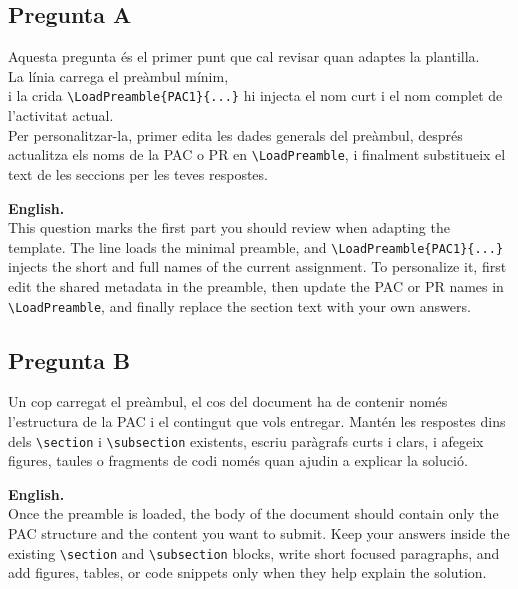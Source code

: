 		\subsection{Pregunta A}
			Aquesta pregunta és el primer punt que cal revisar quan adaptes la plantilla.\\
			La línia \verb|| carrega el preàmbul mínim,\\
			i la crida \verb|\LoadPreamble{PAC1}{...}| hi injecta el nom curt i el nom complet de l'activitat actual.
			\\
			Per personalitzar-la, primer edita les dades generals del preàmbul, després actualitza els noms de la PAC o PR en \verb|\LoadPreamble|, i finalment substitueix el text de les seccions per les teves respostes.
			\par\bigskip
			\textbf{English.}\\
			 This question marks the first part you should review when adapting the template. The line \verb|| loads the minimal preamble, and \verb|\LoadPreamble{PAC1}{...}| injects the short and full names of the current assignment. To personalize it, first edit the shared metadata in the preamble, then update the PAC or PR names in \verb|\LoadPreamble|, and finally replace the section text with your own answers.
		\subsection{Pregunta B}
			Un cop carregat el preàmbul, el cos del document ha de contenir només l'estructura de la PAC i el contingut que vols entregar. Mantén les respostes dins dels \verb|\section| i \verb|\subsection| existents, escriu paràgrafs curts i clars, i afegeix figures, taules o fragments de codi només quan ajudin a explicar la solució.
			\par\bigskip
			\textbf{English.}\\
			 Once the preamble is loaded, the body of the document should contain only the PAC structure and the content you want to submit. Keep your answers inside the existing \verb|\section| and \verb|\subsection| blocks, write short focused paragraphs, and add figures, tables, or code snippets only when they help explain the solution.
